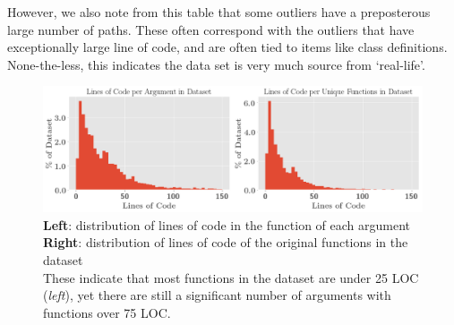However, we also note from this table that some outliers have a preposterous large number of paths. These often correspond with the outliers that have exceptionally large line of code, and are often tied to items like class definitions. None-the-less, this indicates the data set is very much source from `real-life'.



\begin{figure}[tb]
    \centering
    \includegraphics[width=\linewidth]{ImagesCodeRelated/lines_of_code.png}
    \caption { 
    \textbf{Left}: distribution of lines of code in the function of each argument \\
    \textbf{Right}: distribution of lines of code of the original functions in the dataset\\
These indicate that most functions in the dataset are under 25 LOC (\textit{left}), yet there are still a significant number of arguments with functions over 75 LOC.
        }
    \label{fig:loc}
\end{figure}



